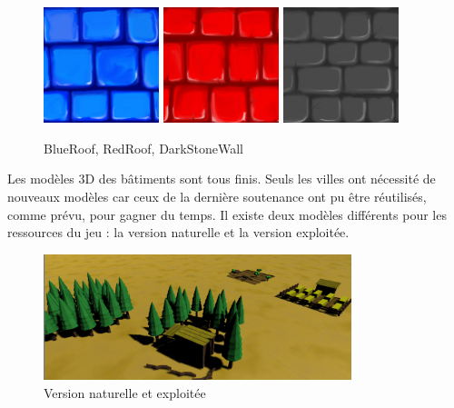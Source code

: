 \documentclass[12pt]{report}
\begin{document}
\begin{figure}[H]
    \centering
    \includegraphics[width=0.3\textwidth]{BlueRoof}
    \includegraphics[width=0.3\textwidth]{RedRoof}
    \includegraphics[width=0.3\textwidth]{DarkStoneWall}
    \caption{BlueRoof, RedRoof, DarkStoneWall}
\end{figure}

Les modèles 3D des bâtiments sont tous finis. Seuls les villes ont nécessité de
nouveaux modèles car ceux de la dernière soutenance ont pu être réutilisés,
comme prévu, pour gagner du temps. Il existe deux modèles différents pour les
ressources du jeu : la version naturelle et la version exploitée.

\begin{figure}[H]
    \centering
    \includegraphics[width=0.8\textwidth]{assets_food_forest}
    \caption{Version naturelle et exploitée}
\end{figure}
\end{document}
